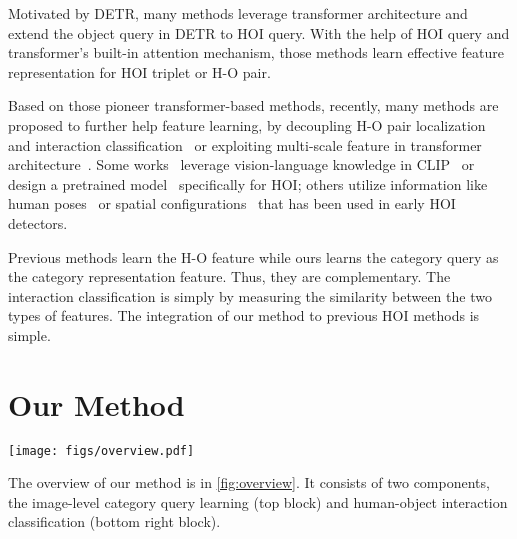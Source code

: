 \documentclass[10pt,twocolumn,letterpaper]{article}
\begin{document}
Motivated by DETR\cite{zou2021end}, many methods\cite{tamura2021qpic, zou2021end, kim2021hotr, chen2021reformulating} leverage transformer architecture\cite{vaswani2017attention} and extend the object query in DETR to HOI query. With the help of HOI query and transformer's built-in attention mechanism, those methods learn effective feature representation for HOI triplet or H-O pair.

Based on those pioneer transformer-based methods, recently, many methods are proposed to further help feature learning, by decoupling H-O pair localization and interaction classification~\cite{zhang2021mining, zhou2022disentangled, liao2022gen} or exploiting multi-scale feature in transformer architecture~\cite{kim2022mstr}. Some works~\cite{liao2022gen, dong2022catn} leverage vision-language knowledge in CLIP~\cite{radford2021CLIP} or design a pretrained model~\cite{yuan2022rlip} specifically for HOI; others utilize information like human poses~\cite{wu2022bodypartmap} or spatial configurations~\cite{iftekhar2022ssrt} that has been used in early HOI detectors.

 Previous methods learn the H-O feature while ours learns the category query as the category representation feature. Thus, they are complementary. The interaction classification is simply by measuring the similarity between the two types of features. The integration of our method to previous HOI methods is simple.

\section{Our Method}
\label{sec.method}

\begin{figure*}
  \centering
\texttt{[image: figs/overview.pdf]}
  \caption{Overview of our method.
  It consists of two components (top and bottom right). It can be integrated with any baseline HOI method (bottom left) that provides image feature $I$ and human-object instance features $F_i$. See \cref{sec.method} for details.
   }
  \vspace{-8pt}
  \label{fig:overview}
\end{figure*}

The overview of our method is in \cref{fig:overview}. It consists of two components, the image-level category query learning (top block) and human-object interaction classification (bottom right block).
\end{document}
